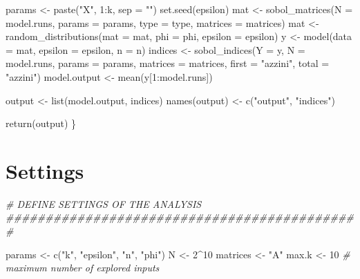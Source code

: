 \documentclass[
  11pt,
]{article}
\newenvironment{Shaded}{\begin{snugshade}}{\end{snugshade}}
\newcommand{\AttributeTok}[1]{\textcolor[rgb]{0.77,0.63,0.00}{#1}}
\newcommand{\CommentTok}[1]{\textcolor[rgb]{0.56,0.35,0.01}{\textit{#1}}}
\newcommand{\DecValTok}[1]{\textcolor[rgb]{0.00,0.00,0.81}{#1}}
\newcommand{\FunctionTok}[1]{\textcolor[rgb]{0.00,0.00,0.00}{#1}}
\newcommand{\NormalTok}[1]{#1}
\newcommand{\OtherTok}[1]{\textcolor[rgb]{0.56,0.35,0.01}{#1}}
\newcommand{\SpecialCharTok}[1]{\textcolor[rgb]{0.00,0.00,0.00}{#1}}
\newcommand{\StringTok}[1]{\textcolor[rgb]{0.31,0.60,0.02}{#1}}
\begin{document}
\begin{Shaded}
\begin{Highlighting}[]
\NormalTok{  params }\OtherTok{\textless{}{-}} \FunctionTok{paste}\NormalTok{(}\StringTok{"X"}\NormalTok{, }\DecValTok{1}\SpecialCharTok{:}\NormalTok{k, }\AttributeTok{sep =} \StringTok{""}\NormalTok{)}
  \FunctionTok{set.seed}\NormalTok{(epsilon)}
\NormalTok{  mat }\OtherTok{\textless{}{-}} \FunctionTok{sobol\_matrices}\NormalTok{(}\AttributeTok{N =}\NormalTok{ model.runs, }\AttributeTok{params =}\NormalTok{ params, }\AttributeTok{type =}\NormalTok{ type,}
                        \AttributeTok{matrices =}\NormalTok{ matrices)}
\NormalTok{  mat }\OtherTok{\textless{}{-}} \FunctionTok{random\_distributions}\NormalTok{(}\AttributeTok{mat =}\NormalTok{ mat, }\AttributeTok{phi =}\NormalTok{ phi, }\AttributeTok{epsilon =}\NormalTok{ epsilon)}
\NormalTok{  y }\OtherTok{\textless{}{-}} \FunctionTok{model}\NormalTok{(}\AttributeTok{data =}\NormalTok{ mat, }\AttributeTok{epsilon =}\NormalTok{ epsilon, }\AttributeTok{n =}\NormalTok{ n)}
\NormalTok{  indices }\OtherTok{\textless{}{-}} \FunctionTok{sobol\_indices}\NormalTok{(}\AttributeTok{Y =}\NormalTok{ y, }\AttributeTok{N =}\NormalTok{ model.runs, }\AttributeTok{params =}\NormalTok{ params, }\AttributeTok{matrices =}\NormalTok{ matrices,}
                           \AttributeTok{first =} \StringTok{"azzini"}\NormalTok{, }\AttributeTok{total =} \StringTok{"azzini"}\NormalTok{)}
\NormalTok{  model.output }\OtherTok{\textless{}{-}} \FunctionTok{mean}\NormalTok{(y[}\DecValTok{1}\SpecialCharTok{:}\NormalTok{model.runs])}

\NormalTok{  output }\OtherTok{\textless{}{-}} \FunctionTok{list}\NormalTok{(model.output, indices)}
  \FunctionTok{names}\NormalTok{(output) }\OtherTok{\textless{}{-}} \FunctionTok{c}\NormalTok{(}\StringTok{"output"}\NormalTok{, }\StringTok{"indices"}\NormalTok{)}

  \FunctionTok{return}\NormalTok{(output)}
\NormalTok{\}}
\end{Highlighting}
\end{Shaded}

\hypertarget{settings}{%
\section{Settings}\label{settings}}

\begin{Shaded}
\begin{Highlighting}[]
\CommentTok{\# DEFINE SETTINGS OF THE ANALYSIS \#\#\#\#\#\#\#\#\#\#\#\#\#\#\#\#\#\#\#\#\#\#\#\#\#\#\#\#\#\#\#\#\#\#\#\#\#\#\#\#\#\#\#\#\#}

\NormalTok{params }\OtherTok{\textless{}{-}} \FunctionTok{c}\NormalTok{(}\StringTok{"k"}\NormalTok{, }\StringTok{"epsilon"}\NormalTok{, }\StringTok{"n"}\NormalTok{, }\StringTok{"phi"}\NormalTok{)}
\NormalTok{N }\OtherTok{\textless{}{-}} \DecValTok{2}\SpecialCharTok{\^{}}\DecValTok{10}
\NormalTok{matrices }\OtherTok{\textless{}{-}} \StringTok{"A"}
\NormalTok{max.k }\OtherTok{\textless{}{-}} \DecValTok{10} \CommentTok{\# maximum number of explored inputs}
\end{Highlighting}
\end{Shaded}
\end{document}

